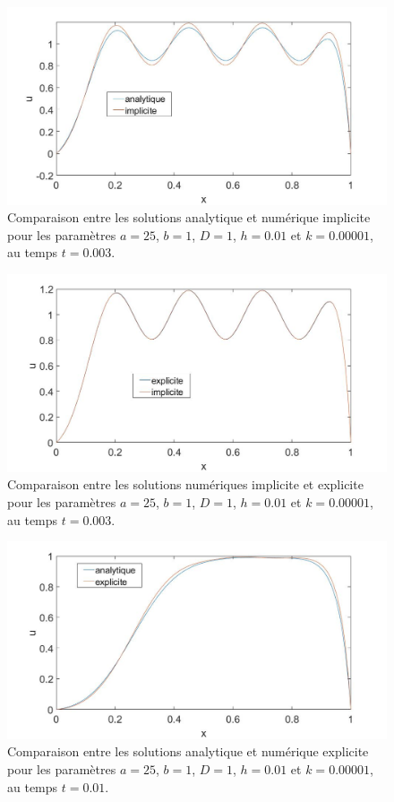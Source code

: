 \documentclass[a4paper, 12pt]{report}
\begin{document}
\begin{figure}[H]
  \center
  \includegraphics[scale=0.4]{images/analy_vs_impl_t_end_0dot003.jpg}
  \caption{Comparaison entre les solutions analytique et numérique implicite pour
  les paramètres $a=25$, $b=1$, $D=1$, $h=0.01$ et $k=0.00001$, au temps $t=0.003$.}
  \label{fig:analy_vs_implicite}
\end{figure}

\begin{figure}[H]
  \center
  \includegraphics[scale=0.4]{images/expl_vs_impl_t_end_0dot003.jpg}
  \caption{Comparaison entre les solutions numériques implicite et explicite pour
  les paramètres $a=25$, $b=1$, $D=1$, $h=0.01$ et $k=0.00001$, au temps $t=0.003$.}
  \label{eq:expl_vs_impl_t0dot003}
\end{figure}

\begin{figure}[H]
  \center
  \includegraphics[scale=0.4]{images/analy_vs_expl_t_end_0dot01.jpg}
  \caption{Comparaison entre les solutions analytique et numérique explicite pour
  les paramètres $a=25$, $b=1$, $D=1$, $h=0.01$ et $k=0.00001$, au temps $t=0.01$.}
\end{figure}
\end{document}
